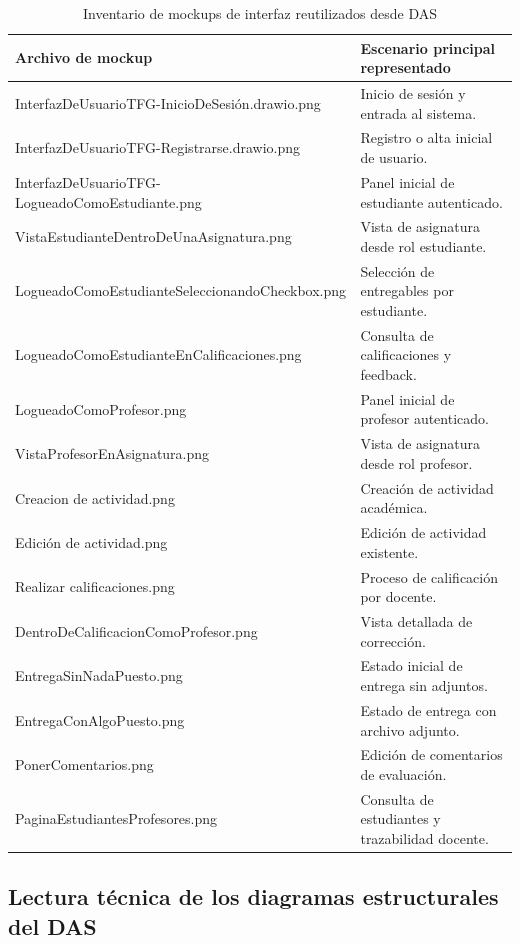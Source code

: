 \begin{table}[!htbp]
\centering
\small
\begin{tabular}{|P{4.9cm}|P{6.8cm}|}
\hline
\textbf{Archivo de mockup} & \textbf{Escenario principal representado} \\
\hline
InterfazDeUsuarioTFG-InicioDeSesi\'on.drawio.png & Inicio de sesi\'on y entrada al sistema. \\
\hline
InterfazDeUsuarioTFG-Registrarse.drawio.png & Registro o alta inicial de usuario. \\
\hline
InterfazDeUsuarioTFG-LogueadoComoEstudiante.png & Panel inicial de estudiante autenticado. \\
\hline
VistaEstudianteDentroDeUna\-Asignatura.png & Vista de asignatura desde rol estudiante. \\
\hline
LogueadoComoEstudiante\-Seleccionando\-Checkbox.png & Selecci\'on de entregables por estudiante. \\
\hline
LogueadoComoEstudianteEn\-Calificaciones.png & Consulta de calificaciones y feedback. \\
\hline
LogueadoComoProfesor.png & Panel inicial de profesor autenticado. \\
\hline
VistaProfesorEnAsignatura.png & Vista de asignatura desde rol profesor. \\
\hline
Creacion de actividad.png & Creaci\'on de actividad acad\'emica. \\
\hline
Edici\'on de actividad.png & Edici\'on de actividad existente. \\
\hline
Realizar calificaciones.png & Proceso de calificaci\'on por docente. \\
\hline
DentroDeCalificacionComo\-Profesor.png & Vista detallada de correcci\'on. \\
\hline
EntregaSinNadaPuesto.png & Estado inicial de entrega sin adjuntos. \\
\hline
EntregaConAlgoPuesto.png & Estado de entrega con archivo adjunto. \\
\hline
PonerComentarios.png & Edici\'on de comentarios de evaluaci\'on. \\
\hline
PaginaEstudiantesProfesores.png & Consulta de estudiantes y trazabilidad docente. \\
\hline
\end{tabular}
\normalsize
\caption{Inventario de mockups de interfaz reutilizados desde DAS}
\label{tab:das-mockups}
\end{table}

\subsection{Lectura t\'ecnica de los diagramas estructurales del DAS}

